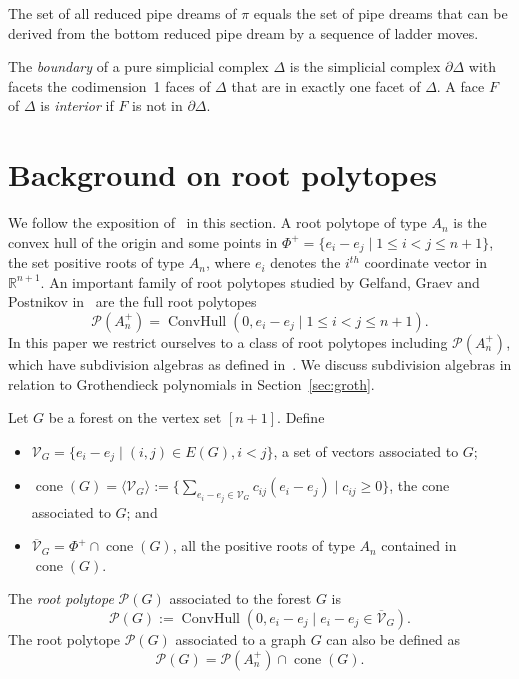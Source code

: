 \documentclass[ALCO,ThmDefs]{cedram}
\numberwithin{equation}{section}
\DeclareMathOperator{\cone}{cone}
\DeclareMathOperator{\ConvHull}{ConvHull}
\newcommand*\+{\smash{\lower2pt\hbox{\rlap{\vrule height14pt}}\raise2pt\hbox{\rlap{\hskip-3pt \vrule height.4pt depth0pt width14.7pt}}}}
\begin{document}
\begin{theo}[\cite{rc}]\label{thm:ladder}
The set of all reduced pipe dreams of $\pi$ equals the set of pipe dreams that can be derived from the bottom reduced pipe dream by a sequence of ladder moves.
\end{theo}

The \emph{boundary} of a pure simplicial complex $\Delta$ is the simplicial complex $\partial\Delta$ with facets the codimension~1 faces of $\Delta$ that are in exactly one facet of $\Delta$. A face $F$ of $\Delta$ is \emph{interior} if $F$ is not in $\partial\Delta$.

\section{Background on root polytopes}\label{sec:root}

We follow the exposition of~\cite[Section~4]{groth} in this section. A root polytope of type $A_{n}$ is the convex hull of the origin and some points in $\Phi^+=\{e_i-e_j \mid1\leq i<j\leq n+1\}$, the set positive roots of type $A_n$, where $e_i$ denotes the $i^{th}$ coordinate vector in $\mathbb{R}^{n+1}$. An important family of root polytopes studied by Gelfand, Graev and Postnikov in~\cite{roothistory} are the full root polytopes
\[
\mathcal{P}(A_{n}^+)=\ConvHull(0, e_i-e_j \mid 1\leq i<j\leq n+1).
\]
In this paper we restrict ourselves to a class of root polytopes including $\mathcal{P}(A_{n}^+)$, which have subdivision algebras as defined in~\cite{root1}. We discuss subdivision algebras in relation to Grothendieck polynomials in Section~\ref{sec:groth}.

\goodbreak
Let $G$ be a forest on the vertex set $[n+1]$. Define
\begin{itemize}
\item $\mathcal{V}_G=\{e_i-e_j \mid (i, j) \in E(G), i<j\}$, a set of vectors associated to $G$;
\item $\cone(G)=\langle \mathcal{V}_G \rangle:=\{\sum_{ e_i-e_j \in \mathcal{V}_G}c_{ij} (e_i-e_j) \mid c_{ij}\geq0\}$, the cone associated to $G$; and
\item $\overline{\mathcal{V}}_G=\Phi^+ \cap \cone(G)$, all the positive roots of type $A_n$ contained in $\cone(G)$.
\end{itemize}

The \emph{root polytope} $\mathcal{P}(G)$ associated to the forest $G$ is
\begin{equation}\label{eq11}
\mathcal{P}(G):=\ConvHull(0, e_i-e_j \mid e_i-e_j \in \overline{\mathcal{V}}_G).
\end{equation}
The root polytope $\mathcal{P}(G)$ associated to a graph $G$ can also be defined as 
\begin{equation}\label{eq21}
\mathcal{P}(G)=\mathcal{P}(A_n^+) \cap \cone(G).
\end{equation}
\end{document}
